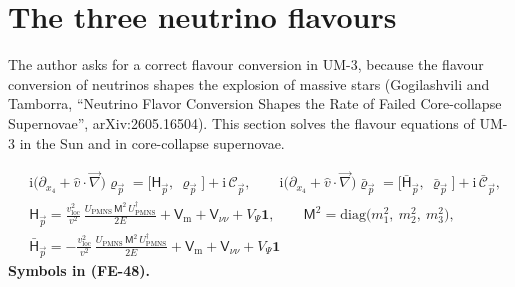 \documentclass[
  10pt,
]{article}
\begin{document}
\hypertarget{the-three-neutrino-flavours}{%
\section{The three neutrino
flavours}\label{the-three-neutrino-flavours}}

The author asks for a correct flavour conversion in UM-3, because the
flavour conversion of neutrinos shapes the explosion of massive stars
(Gogilashvili and Tamborra, ``Neutrino Flavor Conversion Shapes the Rate
of Failed Core-collapse Supernovae'', arXiv:2605.16504). This section
solves the flavour equations of UM-3 in the Sun and in core-collapse
supernovae.

\[
\begin{aligned}
&\mathrm{i}\big(\partial_{x_4} + \hat v\cdot\vec\nabla\big)\varrho_{\vec p} = \big[\mathsf{H}_{\vec p},\ \varrho_{\vec p}\big] + \mathrm{i}\,\mathcal{C}_{\vec p},\qquad
 \mathrm{i}\big(\partial_{x_4} + \hat v\cdot\vec\nabla\big)\bar\varrho_{\vec p} = \big[\bar{\mathsf{H}}_{\vec p},\ \bar\varrho_{\vec p}\big] + \mathrm{i}\,\bar{\mathcal{C}}_{\vec p},\\
&\mathsf{H}_{\vec p} = \frac{v_{\mathrm{loc}}^2}{v^2}\,\frac{U_{\mathrm{PMNS}}\,\mathsf{M}^2\,U_{\mathrm{PMNS}}^\dagger}{2E} + \mathsf{V}_{\mathrm{m}} + \mathsf{V}_{\nu\nu} + V_\Psi\mathbf{1},\qquad
 \mathsf{M}^2 = \mathrm{diag}\big(m_1^2,\ m_2^2,\ m_3^2\big),\\
&\bar{\mathsf{H}}_{\vec p} = -\frac{v_{\mathrm{loc}}^2}{v^2}\,\frac{U_{\mathrm{PMNS}}\,\mathsf{M}^2\,U_{\mathrm{PMNS}}^\dagger}{2E} + \mathsf{V}_{\mathrm{m}} + \mathsf{V}_{\nu\nu} + V_\Psi\mathbf{1}
\end{aligned} \tag{FE-48}
\] \textbf{Symbols in (FE-48).}
\end{document}
